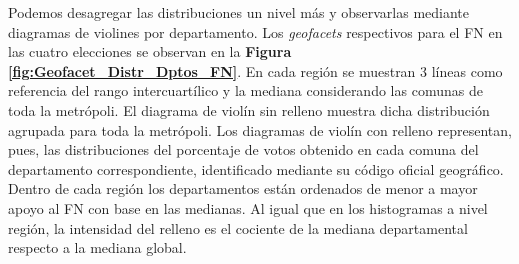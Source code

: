 Podemos desagregar las distribuciones un nivel más y observarlas mediante diagramas de violines por departamento. Los \textit{geofacets} respectivos para el FN en las cuatro elecciones se observan en la \textbf{Figura \ref{fig:Geofacet_Distr_Dptos_FN}}. En cada región se muestran 3 líneas como referencia del rango intercuartílico y la mediana considerando las comunas de toda la metrópoli. El diagrama de violín sin relleno muestra dicha distribución agrupada para toda la metrópoli. Los diagramas de violín con relleno representan, pues, las distribuciones del porcentaje de votos obtenido en cada comuna del departamento correspondiente, identificado mediante su código oficial geográfico. Dentro de cada región los departamentos están ordenados de menor a mayor apoyo al FN con base en las medianas. Al igual que en los histogramas a nivel región, la intensidad del relleno es el cociente de la mediana departamental respecto a la mediana global.\\ 


